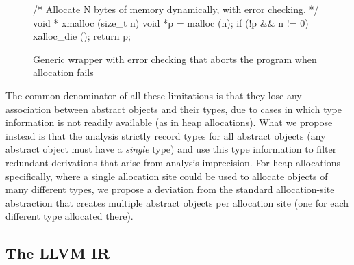 \begin{figure}[ht]
\begin{lcppcode}
/* Allocate N bytes of memory dynamically, with error checking. */
void * xmalloc (size_t n) {
  void *p = malloc (n);
  if (!p && n != 0) xalloc_die ();
  return p;
}
\end{lcppcode}
\caption[Generic  wrapper]{%
  Generic  wrapper with error checking that aborts the
  program when allocation fails}
  \label{structsens/fig/xmalloc}
\end{figure}

The common denominator of all these limitations is that they lose any
association between abstract objects and their types, due to 
cases in which type information is not readily available (as in heap
allocations). What we propose instead is that the analysis strictly
record types for all abstract objects (any abstract object must have a
\emph{single} type) and use this type information to filter redundant
derivations that arise from analysis imprecision. For heap allocations
specifically, where a single allocation site could be used to allocate
objects of many different types, we propose a deviation from the
standard allocation-site abstraction that creates multiple abstract
objects per allocation site (one for each different type allocated
there).


\subsection{The LLVM IR}

